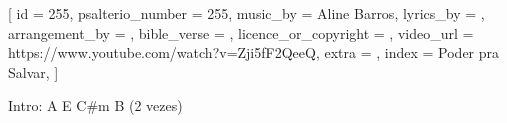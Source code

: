 [
    id                     = {255},
    psalterio_number       = {255},
    music_by               = {Aline Barros},
    lyrics_by              = {},
    arrangement_by         = {},
    bible_verse            = {},
    licence_or_copyright   = {},
    video_url              = {https://www.youtube.com/watch?v=Zji5fF2QeeQ},
    extra                  = {},
    index                  = {Poder pra Salvar},
]


\beginverse*
Intro: A E C#m B
(2 vezes)
\endverse


\beginverse

